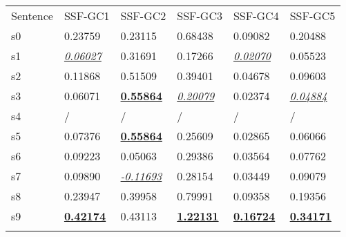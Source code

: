 \begin{tabular}{llllll}
\noalign{\smallskip}\hline\noalign{\smallskip}
Sentence & SSF-GC1 & SSF-GC2 & SSF-GC3 & SSF-GC4 & SSF-GC5  \\
\noalign{\smallskip}\hline\noalign{\smallskip}

s0 & 0.23759 & 0.23115 & 0.68438 & 0.09082 & 0.20488 \\
s1 & \underline{\textit{0.06027}} & 0.31691 & 0.17266 & \underline{\textit{0.02070}} & 0.05523 \\
s2 & 0.11868 & 0.51509 & 0.39401 & 0.04678 & 0.09603 \\
s3 & 0.06071 & \underline{\textbf{0.55864}} & \underline{\textit{0.20079}} & 0.02374 & \underline{\textit{0.04884}} \\
s4 & / & / & / & / & / \\
s5 & 0.07376 & \underline{\textbf{0.55864}} & 0.25609 & 0.02865 & 0.06066 \\
s6 & 0.09223 & 0.05063 & 0.29386 & 0.03564 & 0.07762 \\
s7 & 0.09890 & \underline{\textit{-0.11693}} & 0.28154 & 0.03449 & 0.09079 \\
s8 & 0.23947 & 0.39958 & 0.79991 & 0.09358 & 0.19356 \\
s9 & \underline{\textbf{0.42174}} & 0.43113 & \underline{\textbf{1.22131}} & \underline{\textbf{0.16724}} & \underline{\textbf{0.34171}} \\

\noalign{\smallskip}\hline
\end{tabular} 
